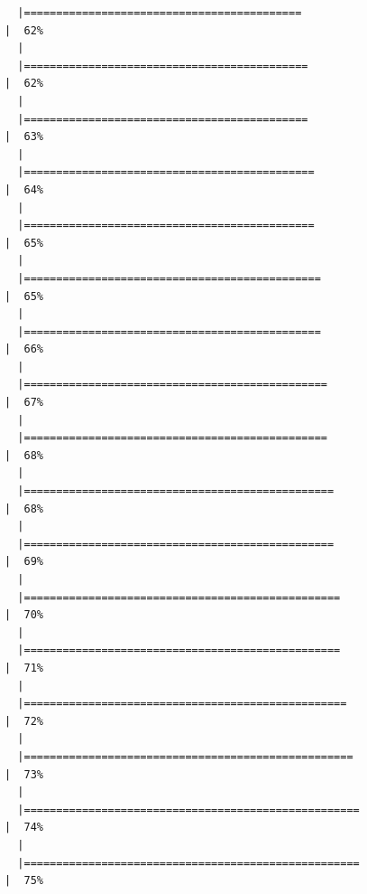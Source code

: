 \documentclass[
  letterpaper,
  DIV=11,
  numbers=noendperiod]{scrreprt}
\begin{document}
\begin{verbatim}
  |===========================================                           |  62%
  |                                                                            
  |============================================                          |  62%
  |                                                                            
  |============================================                          |  63%
  |                                                                            
  |=============================================                         |  64%
  |                                                                            
  |=============================================                         |  65%
  |                                                                            
  |==============================================                        |  65%
  |                                                                            
  |==============================================                        |  66%
  |                                                                            
  |===============================================                       |  67%
  |                                                                            
  |===============================================                       |  68%
  |                                                                            
  |================================================                      |  68%
  |                                                                            
  |================================================                      |  69%
  |                                                                            
  |=================================================                     |  70%
  |                                                                            
  |=================================================                     |  71%
  |                                                                            
  |==================================================                    |  72%
  |                                                                            
  |===================================================                   |  73%
  |                                                                            
  |====================================================                  |  74%
  |                                                                            
  |====================================================                  |  75%

\end{verbatim}
\end{document}
